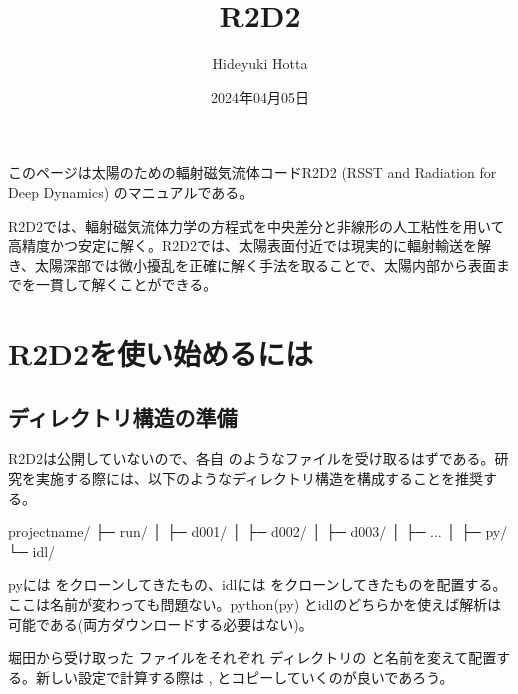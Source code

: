 \documentclass[letterpaper,10pt,dvipdfmx,report]{sphinxmanual}
\title{R2D2}
\date{2024年04月05日}
\author{Hideyuki Hotta}
\let\sphinxpxdimen\pdfpxdimen\else\newdimen\sphinxpxdimen
\begin{document}
\pagestyle{empty}
\sphinxmaketitle
\pagestyle{plain}
\sphinxtableofcontents
\pagestyle{normal}
\label{\detokenize{index::doc}}


\sphinxAtStartPar
このページは太陽のための輻射磁気流体コードR2D2 (RSST and Radiation for Deep Dynamics)
のマニュアルである。

\sphinxAtStartPar
{}

\sphinxAtStartPar
R2D2では、輻射磁気流体力学の方程式を中央差分と非線形の人工粘性を用いて高精度かつ安定に解く。R2D2では、太陽表面付近では現実的に輻射輸送を解き、太陽深部では微小擾乱を正確に解く手法を取ることで、太陽内部から表面までを一貫して解くことができる。

\noindent\sphinxincludegraphics[width=350\sphinxpxdimen]{{R2D2_logo_red}.png}

\sphinxstepscope


\chapter{R2D2を使い始めるには}
\label{\detokenize{start:r2d2}}\label{\detokenize{start::doc}}

\section{ディレクトリ構造の準備}
\label{\detokenize{start:id1}}
\sphinxAtStartPar
R2D2は公開していないので、各自  のようなファイルを受け取るはずである。研究を実施する際には、以下のようなディレクトリ構造を構成することを推奨する。

\begin{sphinxVerbatim}[commandchars=\\\{\}]
project\PYGZus{}name/
           ├─ run/
           │    ├─ d001/
           │    ├─ d002/
           │    ├─ d003/
           │    ├─ ...
           │
           ├─ py/
           └─ idl/
\end{sphinxVerbatim}

\sphinxAtStartPar
pyには  をクローンしてきたもの、idlには  をクローンしてきたものを配置する。ここは名前が変わっても問題ない。python(py) とidlのどちらかを使えば解析は可能である(両方ダウンロードする必要はない)。

\sphinxAtStartPar
堀田から受け取った  ファイルをそれぞれ  ディレクトリの  と名前を変えて配置する。新しい設定で計算する際は ,  とコピーしていくのが良いであろう。
\end{document}
